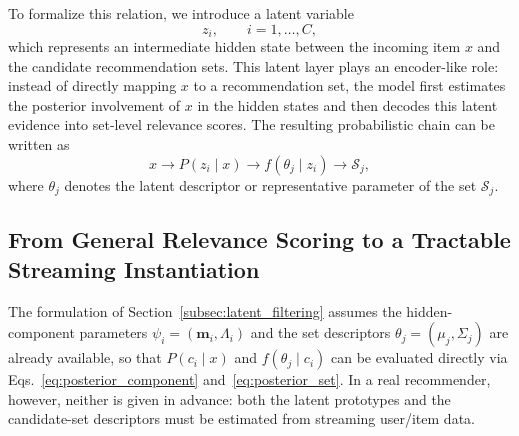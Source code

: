 \documentclass{article}
\begin{document}
To formalize this relation, we introduce a latent variable
\[
z_i,\qquad i=1,\ldots,C,
\]
which represents an intermediate hidden state between the incoming item \(x\) and the candidate recommendation sets. This latent layer plays an encoder-like role: instead of directly mapping \(x\) to a recommendation set, the model first estimates the posterior involvement of \(x\) in the hidden states and then decodes this latent evidence into set-level relevance scores. The resulting probabilistic chain can be written as
\[
x
\longrightarrow
P(z_i\mid x)
\longrightarrow
f(\theta_j\mid z_i)
\longrightarrow
\mathcal{S}_j,
\]
where \(\theta_j\) denotes the latent descriptor or representative parameter of the set \(\mathcal{S}_j\).


























\subsection{From General Relevance Scoring to a Tractable Streaming Instantiation}
\label{subsec:bridge}

The formulation of Section~\ref{subsec:latent_filtering} assumes the hidden-component parameters $\psi_i = (\mathbf{m}_i, \Lambda_i)$ and the set descriptors $\theta_j = (\mu_j, \Sigma_j)$ are already available, so that $P(c_i \mid x)$ and $f(\theta_j \mid c_i)$ can be evaluated directly via Eqs.~\eqref{eq:posterior_component} and~\eqref{eq:posterior_set}. In a real recommender, however, neither is given in advance: both the latent prototypes and the candidate-set descriptors must be estimated from streaming user/item data.
\end{document}
